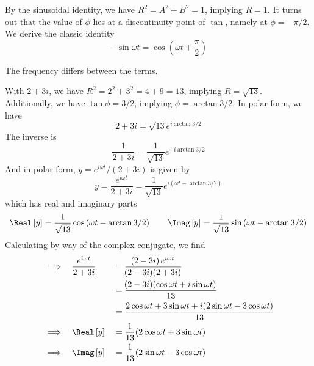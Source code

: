 \documentclass[a4paper]{article}
\begin{document}
\vspace{12pt}


By the sinusoidal identity, we have \(R^{2} = A^{2} + B^{2} = 1\), implying \(R = 1\). It turns out that the value of \(\phi \) lies at a discontinuity point of \(\tan\), namely at \(\phi = - \pi /2\). We derive the classic identity
\[
	- \sin \omega t = \cos\left( \omega t + \frac{\pi }{2}\right)
\]


The frequency differs between the terms.

\vspace{12pt}


With \(2 + 3i\), we have \(R^{2} = 2^{2} + 3^{2} = 4 + 9 = 13\), implying \(R = \sqrt{13}\). Additionally, we have \(\tan \phi = 3/2\), implying \(\phi = \arctan 3/2 \). In polar form, we have
\[
	2 + 3i = \sqrt{13} e^{i \arctan 3/2}
\]
The inverse is
\[
	\frac{1}{2 + 3i} = \frac{1}{\sqrt{13}} e^{-i \arctan 3/2}
\]
And in polar form, \(y = e^{i \omega t}/ \!\left( 2 + 3i \right) \) is given by
\[
	y = \frac{e^{i \omega t}}{2 + 3i} = \frac{1}{\sqrt{13}} e^{i \!\left( \omega t - \arctan 3/2 \right) }
\]
which has real and imaginary parts
\[
	\Real \left[ y \right] = \frac{1}{\sqrt{13}} \cos\left( \omega t - \arctan 3/2 \right) \qquad \Imag \left[ y \right] = \frac{1}{\sqrt{13}} \sin\left( \omega t - \arctan 3/2 \right)
\]
Calculating by way of the complex conjugate, we find
\begin{alignat*}{3}
	&\implies && \frac{e^{i \omega t}}{2 + 3i} && = \frac{\!\left( 2 - 3i \right) e^{i \omega t}}{\!\left( 2 - 3i \right) \!\left( 2 + 3i \right) } \\
	& && && = \frac{\!\left( 2 - 3i \right) \!\left( \cos \omega t + i \sin \omega t \right) }{13}  \\
	& && && = \frac{2 \cos \omega t + 3 \sin \omega t + i \!\left( 2 \sin \omega t - 3 \cos \omega t \right) }{13} \\
	&\implies && \Real \left[ y \right] && = \frac{1}{13} \!\left( 2 \cos \omega t + 3 \sin \omega t\right) \\
	&\implies && \Imag \left[ y \right] && = \frac{1}{13} \!\left( 2 \sin \omega t - 3 \cos \omega t \right) 
\end{alignat*}
\end{document}
